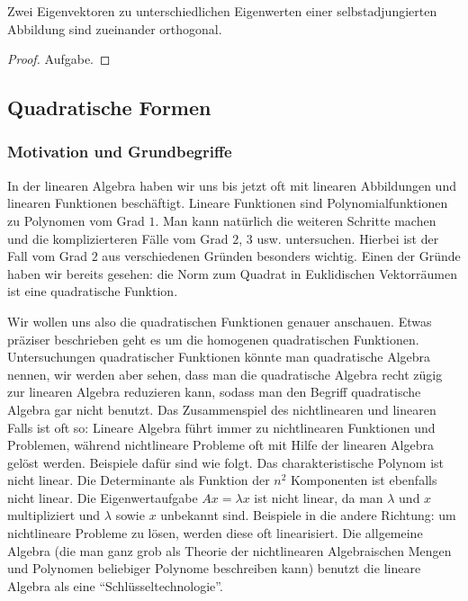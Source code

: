 \begin{klr}
	Zwei Eigenvektoren zu unterschiedlichen Eigenwerten einer selbstadjungierten Abbildung sind zueinander orthogonal.
\end{klr}
\begin{proof}
	Aufgabe.
\end{proof}

\subsection{Quadratische Formen}

\subsubsection{Motivation und Grundbegriffe}

In der linearen Algebra haben wir uns bis jetzt oft mit linearen Abbildungen und linearen Funktionen beschäftigt. Lineare Funktionen sind Polynomialfunktionen zu Polynomen vom Grad $1$. Man kann natürlich die weiteren Schritte machen und die komplizierteren Fälle vom Grad $2$, $3$ usw. untersuchen. Hierbei ist der Fall vom Grad $2$ aus verschiedenen Gründen besonders wichtig. Einen der Gründe haben wir bereits gesehen: die Norm zum Quadrat in Euklidischen Vektorräumen ist eine quadratische Funktion.

Wir wollen uns also die quadratischen Funktionen genauer anschauen. Etwas präziser beschrieben geht es um die homogenen quadratischen Funktionen. Untersuchungen quadratischer Funktionen könnte man quadratische Algebra nennen, wir werden aber sehen, dass man die quadratische Algebra recht zügig zur linearen Algebra reduzieren kann, sodass man den Begriff quadratische Algebra gar nicht benutzt. Das Zusammenspiel des nichtlinearen und linearen Falls ist oft so: Lineare Algebra führt immer zu nichtlinearen Funktionen und Problemen, während nichtlineare Probleme oft mit Hilfe der linearen Algebra gelöst werden. Beispiele dafür sind wie folgt. Das charakteristische Polynom ist nicht linear. Die Determinante als Funktion der $n^2$ Komponenten ist ebenfalls nicht linear. Die Eigenwertaufgabe $Ax = \lambda x$ ist nicht linear, da man $\lambda$ und $x$ multipliziert und $\lambda$ sowie $x$ unbekannt sind. Beispiele in die andere Richtung: um nichtlineare Probleme zu lösen, werden diese oft linearisiert. Die allgemeine Algebra (die man ganz grob als Theorie der nichtlinearen Algebraischen Mengen und Polynomen beliebiger Polynome beschreiben kann) benutzt die lineare Algebra als eine ``Schlüsseltechnologie''. 

